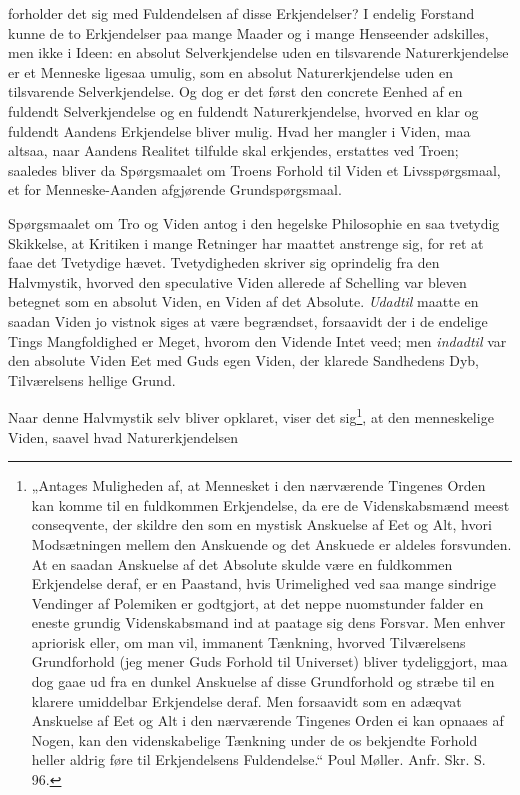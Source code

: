 \documentclass[12pt,a4paper]{book}
\begin{document}
\setcounter{footnote}{0}
forholder det sig med Fuldendelsen af disse Erkjendelser? I endelig Forstand
kunne de to Erkjendelser paa mange Maader og i mange Henseender adskilles, men
ikke i Ideen: en absolut Selverkjendelse uden en tilsvarende Naturerkjendelse er
et Menneske ligesaa umulig, som en absolut Naturerkjendelse uden en tilsvarende
Selverkjendelse. Og dog er det først den concrete Eenhed af en fuldendt
Selverkjendelse og en fuldendt Naturerkjendelse, hvorved en klar og fuldendt
Aandens Erkjendelse bliver mulig. Hvad her mangler i Viden, maa altsaa, naar
Aandens Realitet tilfulde skal erkjendes, erstattes ved Troen; saaledes bliver da
Spørgsmaalet om Troens Forhold til Viden et Livsspørgsmaal, et for
Menneske-Aanden afgjørende Grundspørgsmaal.

Spørgsmaalet om Tro og Viden antog i den hegelske Philosophie en saa tvetydig
Skikkelse, at Kritiken i mange Retninger har maattet anstrenge sig, for ret at
faae det Tvetydige hævet. Tvetydigheden skriver sig oprindelig fra den
Halvmystik, hvorved den speculative Viden allerede af Schelling var bleven
betegnet som en absolut Viden, en Viden af det Absolute. \emph{Udadtil} maatte en
saadan Viden jo vistnok siges at være begrændset, forsaavidt der i de endelige
Tings Mangfoldighed er Meget, hvorom den Vidende Intet veed; men
\emph{indadtil} var den absolute Viden Eet med Guds egen Viden, der klarede
Sandhedens Dyb, Tilværelsens hellige Grund.

Naar denne Halvmystik selv bliver opklaret, viser det sig\footnote{„Antages
Muligheden af, at Mennesket i den nærværende Tingenes Orden kan komme til en
fuldkommen Erkjendelse, da ere de Videnskabsmænd meest conseqvente, der skildre
den som en mystisk Anskuelse af Eet og Alt, hvori Modsætningen mellem den
Anskuende og det Anskuede er aldeles forsvunden. At en saadan Anskuelse af det
Absolute skulde være en fuldkommen Erkjendelse deraf, er en Paastand, hvis
Urimelighed ved saa mange sindrige Vendinger af Polemiken er godtgjort, at det
neppe nuomstunder falder en eneste grundig Videnskabsmand ind at paatage sig dens
Forsvar. Men enhver apriorisk eller, om man vil, immanent Tænkning, hvorved
Tilværelsens Grundforhold (jeg mener Guds Forhold til Universet) bliver
tydeliggjort, maa dog gaae ud fra en dunkel Anskuelse af disse Grundforhold og
stræbe til en klarere umiddelbar Erkjendelse deraf. Men forsaavidt som en adæqvat
Anskuelse af Eet og Alt i den nærværende Tingenes Orden ei kan opnaaes af Nogen,
kan den videnskabelige Tænkning under de os bekjendte Forhold heller aldrig føre
til Erkjendelsens Fuldendelse.“ Poul Møller. Anfr. Skr. S. 96.}, at den
menneskelige Viden, saavel hvad Naturerkjendelsen
\end{document}
